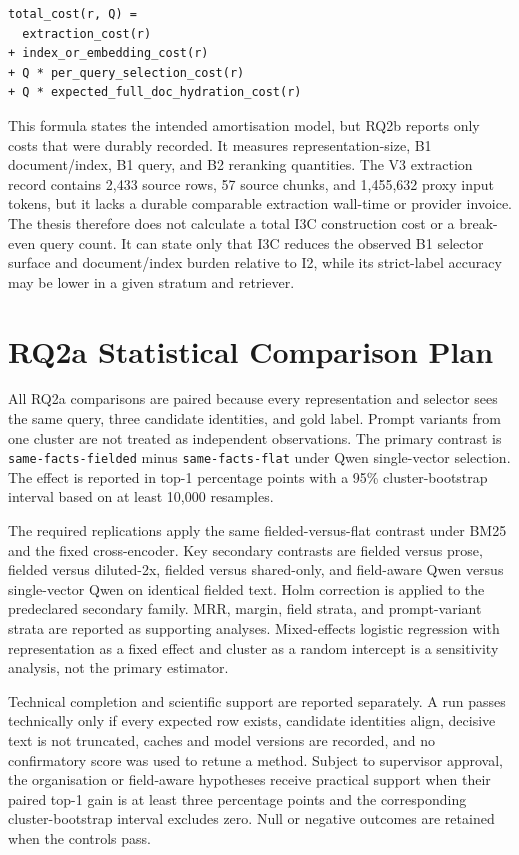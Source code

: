 \begin{verbatim}
total_cost(r, Q) =
  extraction_cost(r)
+ index_or_embedding_cost(r)
+ Q * per_query_selection_cost(r)
+ Q * expected_full_doc_hydration_cost(r)
\end{verbatim}

This formula states the intended amortisation model, but RQ2b reports only costs that were durably recorded. It measures representation-size, B1 document/index, B1 query, and B2 reranking quantities. The V3 extraction record contains 2,433 source rows, 57 source chunks, and 1,455,632 proxy input tokens, but it lacks a durable comparable extraction wall-time or provider invoice. The thesis therefore does not calculate a total I3C construction cost or a break-even query count. It can state only that I3C reduces the observed B1 selector surface and document/index burden relative to I2, while its strict-label accuracy may be lower in a given stratum and retriever.

\section{RQ2a Statistical Comparison Plan}

All RQ2a comparisons are paired because every representation and selector sees the same query, three candidate identities, and gold label. Prompt variants from one cluster are not treated as independent observations. The primary contrast is \texttt{same-facts-fielded} minus \texttt{same-facts-flat} under Qwen single-vector selection. The effect is reported in top-1 percentage points with a 95\% cluster-bootstrap interval based on at least 10,000 resamples.

The required replications apply the same fielded-versus-flat contrast under BM25 and the fixed cross-encoder. Key secondary contrasts are fielded versus prose, fielded versus diluted-2x, fielded versus shared-only, and field-aware Qwen versus single-vector Qwen on identical fielded text. Holm correction is applied to the predeclared secondary family. MRR, margin, field strata, and prompt-variant strata are reported as supporting analyses. Mixed-effects logistic regression with representation as a fixed effect and cluster as a random intercept is a sensitivity analysis, not the primary estimator.

Technical completion and scientific support are reported separately. A run passes technically only if every expected row exists, candidate identities align, decisive text is not truncated, caches and model versions are recorded, and no confirmatory score was used to retune a method. Subject to supervisor approval, the organisation or field-aware hypotheses receive practical support when their paired top-1 gain is at least three percentage points and the corresponding cluster-bootstrap interval excludes zero. Null or negative outcomes are retained when the controls pass.

